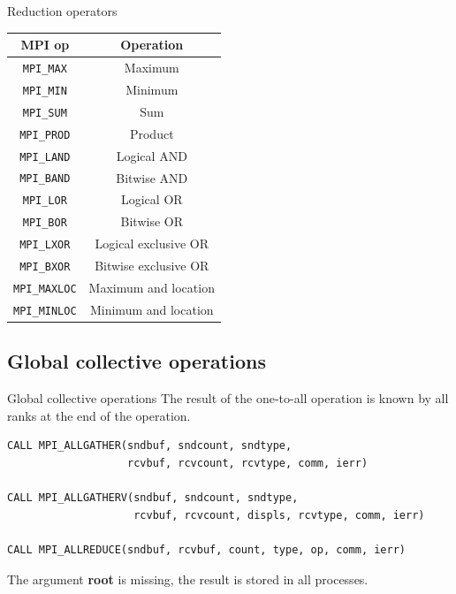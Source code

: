 \documentclass[aspectratio=43]{beamer}
\begin{document}
\begin{frame}[fragile]{Reduction operators}
\begin{center}
\begin{tabular}{|c||c|}
    \hline
    \color{cscsblue}\textbf{MPI op} & \color{cscsbrown}\textbf{Operation} \\\hline\hline
    \verb+MPI_MAX+ & Maximum\\\hline
    \verb+MPI_MIN+ & Minimum\\\hline
    \verb+MPI_SUM+ & Sum\\\hline
    \verb+MPI_PROD+ & Product\\\hline
    \verb+MPI_LAND+ & Logical AND\\\hline
    \verb+MPI_BAND+ & Bitwise AND\\\hline
    \verb+MPI_LOR+ & Logical OR\\\hline
    \verb+MPI_BOR+ & Bitwise OR\\\hline
    \verb+MPI_LXOR+ & Logical exclusive OR\\\hline
    \verb+MPI_BXOR+ & Bitwise exclusive OR\\\hline
    \verb+MPI_MAXLOC+ & Maximum and location\\\hline
    \verb+MPI_MINLOC+ & Minimum and location\\\hline
\end{tabular}
\end{center}
\end{frame}

\subsection{Global collective operations}
\begin{frame}[fragile]{Global collective operations}
The result of the one-to-all operation is known by all ranks at the end of the operation.
\footnotesize
\begin{verbatim}
CALL MPI_ALLGATHER(sndbuf, sndcount, sndtype,
                   rcvbuf, rcvcount, rcvtype, comm, ierr)

CALL MPI_ALLGATHERV(sndbuf, sndcount, sndtype,
                    rcvbuf, rcvcount, displs, rcvtype, comm, ierr)

CALL MPI_ALLREDUCE(sndbuf, rcvbuf, count, type, op, comm, ierr)
\end{verbatim}
The argument \textbf{root} is missing, the result is stored in all processes.\\
\end{frame}
\end{document}
